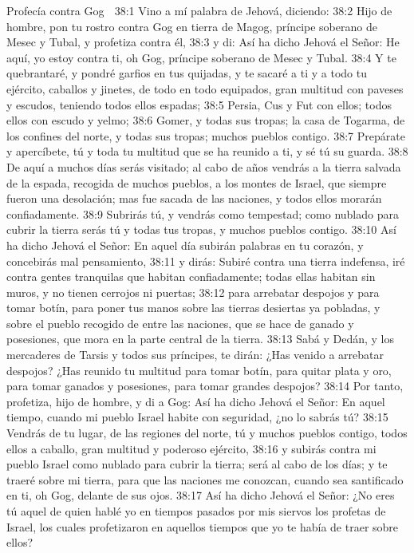 Profecía contra Gog  

38:1 Vino a mí palabra de Jehová, diciendo:  
38:2 Hijo de hombre, pon tu rostro contra Gog en tierra de Magog, príncipe soberano de Mesec y Tubal, y profetiza contra él,  
38:3 y di: Así ha dicho Jehová el Señor: He aquí, yo estoy contra ti, oh Gog, príncipe soberano de Mesec y Tubal.  
38:4 Y te quebrantaré, y pondré garfios en tus quijadas, y te sacaré a ti y a todo tu ejército, caballos y jinetes, de todo en todo equipados, gran multitud con paveses y escudos, teniendo todos ellos espadas;  
38:5 Persia, Cus y Fut con ellos; todos ellos con escudo y yelmo;  
38:6 Gomer, y todas sus tropas; la casa de Togarma, de los confines del norte, y todas sus tropas; muchos pueblos contigo.  
38:7 Prepárate y apercíbete, tú y toda tu multitud que se ha reunido a ti, y sé tú su guarda.  
38:8 De aquí a muchos días serás visitado; al cabo de años vendrás a la tierra salvada de la espada, recogida de muchos pueblos, a los montes de Israel, que siempre fueron una desolación; mas fue sacada de las naciones, y todos ellos morarán confiadamente.  
38:9 Subrirás tú, y vendrás como tempestad; como nublado para cubrir la tierra serás tú y todas tus tropas, y muchos pueblos contigo.  
38:10 Así ha dicho Jehová el Señor: En aquel día subirán palabras en tu corazón, y concebirás mal pensamiento,  
38:11 y dirás: Subiré contra una tierra indefensa, iré contra gentes tranquilas que habitan confiadamente; todas ellas habitan sin muros, y no tienen cerrojos ni puertas;  
38:12 para arrebatar despojos y para tomar botín, para poner tus manos sobre las tierras desiertas ya pobladas, y sobre el pueblo recogido de entre las naciones, que se hace de ganado y posesiones, que mora en la parte central de la tierra.  
38:13 Sabá y Dedán, y los mercaderes de Tarsis y todos sus príncipes, te dirán: ¿Has venido a arrebatar despojos? ¿Has reunido tu multitud para tomar botín, para quitar plata y oro, para tomar ganados y posesiones, para tomar grandes despojos?  
38:14 Por tanto, profetiza, hijo de hombre, y di a Gog: Así ha dicho Jehová el Señor: En aquel tiempo, cuando mi pueblo Israel habite con seguridad, ¿no lo sabrás tú?  
38:15 Vendrás de tu lugar, de las regiones del norte, tú y muchos pueblos contigo, todos ellos a caballo, gran multitud y poderoso ejército,  
38:16 y subirás contra mi pueblo Israel como nublado para cubrir la tierra; será al cabo de los días; y te traeré sobre mi tierra, para que las naciones me conozcan, cuando sea santificado en ti, oh Gog, delante de sus ojos.  
38:17 Así ha dicho Jehová el Señor: ¿No eres tú aquel de quien hablé yo en tiempos pasados por mis siervos los profetas de Israel, los cuales profetizaron en aquellos tiempos que yo te había de traer sobre ellos?  
